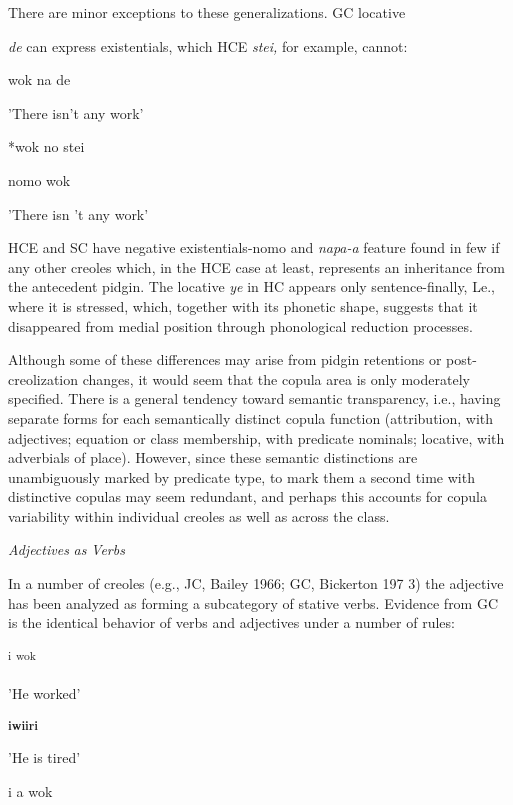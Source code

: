 There are minor exceptions to these generalizations. GC locative

\textit{de }can express existentials, which HCE \textit{stei, }for example, cannot:

\ea\label{ex:60}
 wok na de
\glt
\z

'There isn't any work'

\ea\label{ex:61}
 *wok no stei
\glt
\z

\ea\label{ex:62}
 nomo wok
\glt
\z

'There isn 't any work'

HCE and SC have negative existentials-nomo and \textit{napa-a} feature found in few if any other creoles which, in the HCE case at least, represents an inheritance from the antecedent pidgin. The locative \textit{ye} in HC appears only sentence-finally, Le., where it is stressed, which, together with its phonetic shape, suggests that it disappeared from medial position through phonological reduction processes.


Although some of these differences may arise from pidgin retentions or post-creolization changes, it would seem that the copula area is only moderately specified. There is a general tendency toward semantic transparency, i.e., having separate forms for each semantically distinct copula function (attribution, with adjectives; equation or class membership, with predicate nominals; locative, with adverbials of place). However, since these semantic distinctions are unambiguously marked by predicate type, to mark them a second time with distinc\-tive copulas may seem redundant, and perhaps this accounts for copula variability within individual creoles as well as across the class.

\textit{Adjectives} \textit{as} \textit{Verbs}

In a number of creoles (e.g., JC, Bailey 1966; GC, Bickerton 197 3) the adjective has been analyzed as forming a subcategory of stative verbs. Evidence from GC is the identical behavior of verbs and adjectives under a number of rules:

\ea\label{ex:63}
 \textsuperscript{i} \textsuperscript{wok}
\glt
\z

'He worked'

\ea\label{ex:64}
 \textbf{\textsuperscript{i}}\textbf{\textsuperscript{wiiri}}
\glt
\z

'He is tired'

\ea\label{ex:65}
i a wok
\glt
\z


